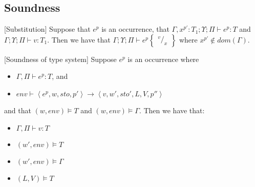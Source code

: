 \documentclass[../../master.tex]{subfiles}
\begin{document}
\subsection{Soundness}
\begin{lemma}{[Substitution]}
	Suppose that $e^p$ is an occurrence, that 
	$\Gamma,x^{p'}:T_1;\Upsilon;\Pi\vdash e^p:T$ 
	and 
	$\Gamma;\Upsilon;\Pi\vdash v:T_1$.
	Then we have that
	$\Gamma;\Upsilon;\Pi\vdash e^p\begin{Bmatrix} ^v/_x \end{Bmatrix}$
	where $x^{p'}\not\in dom(\Gamma)$.
\end{lemma}



\begin{theorem}{[Soundness of type system]}
	Suppose $e^p$ is an occurrence where
	\begin{itemize}
		\item $\Gamma,\Pi\vdash e^p : T$, and 
		\item $env\vdash\left\langle e^p,w,sto,p'\right\rangle\rightarrow\left\langle v,w',sto',L,V,p''\right\rangle$
	\end{itemize}
	and that $(w,env)\models T$ and $(w,env)\models\Gamma$.
	Then we have that:
	\begin{itemize}
		\item $\Gamma,\Pi\vdash v : T$
		\item $(w',env)\models T$
		\item $(w',env)\models\Gamma$
		\item $(L,V)\models T$
	\end{itemize}
\end{theorem}


\end{document}
